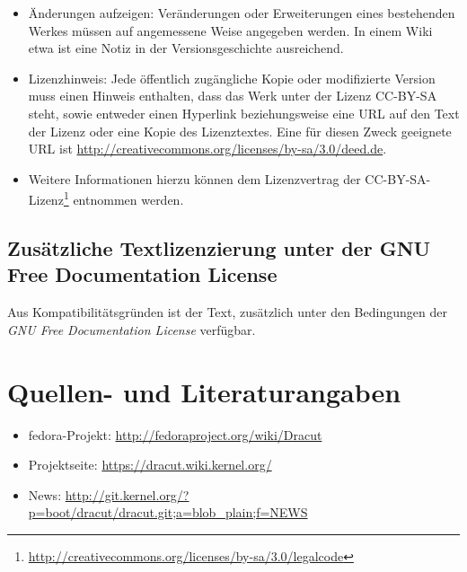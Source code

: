 \documentclass[10pt,a4paper]{article}
\begin{document}
\begin{itemize}
 \item Änderungen aufzeigen: Veränderungen oder Erweiterungen eines bestehenden
 Werkes müssen auf angemessene Weise angegeben werden. In einem Wiki etwa ist
 eine Notiz in der Versionsgeschichte ausreichend.

 \item Lizenzhinweis: Jede öffentlich zugängliche Kopie oder modifizierte
 Version muss einen Hinweis enthalten, dass das Werk unter der Lizenz CC-BY-SA
 steht, sowie entweder einen Hyperlink beziehungsweise eine URL auf den Text
 der Lizenz oder eine Kopie des Lizenztextes. Eine für diesen Zweck geeignete
 URL ist \url{http://creativecommons.org/licenses/by-sa/3.0/deed.de}.

 \item Weitere Informationen hierzu können dem Lizenzvertrag der
 CC-BY-SA-Lizenz\footnote{\url{http://creativecommons.org/licenses/by-sa/3.0/legalcode}}
 entnommen werden.

\end{itemize}

\subsection{Zusätzliche Textlizenzierung unter der GNU Free Documentation License}

Aus Kompatibilitätsgründen ist der Text, zusätzlich unter den Bedingungen der
\textit{GNU Free Documentation License} verfügbar.


\section{Quellen- und Literaturangaben}
\label{sec:quell}

\begin{itemize}
 \item fedora-Projekt: \url{http://fedoraproject.org/wiki/Dracut}
 \item Projektseite: \url{https://dracut.wiki.kernel.org/}
 \item News: \url{http://git.kernel.org/?p=boot/dracut/dracut.git;a=blob_plain;f=NEWS}
\end{itemize}
\end{document}
